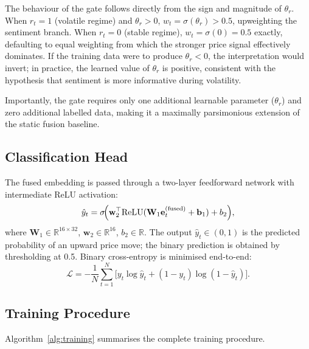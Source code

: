 \documentclass[journal]{IEEEtran}
\begin{document}
The behaviour of the gate follows directly from the sign and magnitude of
$\theta_r$. When $r_t = 1$ (volatile regime) and $\theta_r > 0$,
$w_t = \sigma(\theta_r) > 0.5$, upweighting the sentiment branch.
When $r_t = 0$ (stable regime), $w_t = \sigma(0) = 0.5$ exactly,
defaulting to equal weighting from which the stronger price signal
effectively dominates. If the training data were to produce $\theta_r < 0$,
the interpretation would invert; in practice, the learned value of $\theta_r$
is positive, consistent with the hypothesis that sentiment is more informative
during volatility.

Importantly, the gate requires only one additional learnable parameter
($\theta_r$) and zero additional labelled data, making it a maximally
parsimonious extension of the static fusion baseline.

\subsection{Classification Head}
The fused embedding is passed through a two-layer feedforward network with
intermediate ReLU activation:
\begin{equation}
  \hat{y}_t = \sigma\!\Bigl(
    \mathbf{w}_2^\top \mathrm{ReLU}(\mathbf{W}_1 \mathbf{e}^{(\mathrm{fused})}_t
    + \mathbf{b}_1) + b_2
  \Bigr),
  \label{eq:classifier}
\end{equation}
where $\mathbf{W}_1 \in \mathbb{R}^{16 \times 32}$,
$\mathbf{w}_2 \in \mathbb{R}^{16}$, $b_2 \in \mathbb{R}$.
The output $\hat{y}_t \in (0,1)$ is the predicted probability of an
upward price move; the binary prediction is obtained by thresholding at 0.5.
Binary cross-entropy is minimised end-to-end:
\begin{equation}
  \mathcal{L} = -\frac{1}{N}\sum_{t=1}^{N}
    \bigl[y_t \log \hat{y}_t + (1-y_t)\log(1-\hat{y}_t)\bigr].
  \label{eq:bce}
\end{equation}

\subsection{Training Procedure}
Algorithm~\ref{alg:training} summarises the complete training procedure.
\end{document}
